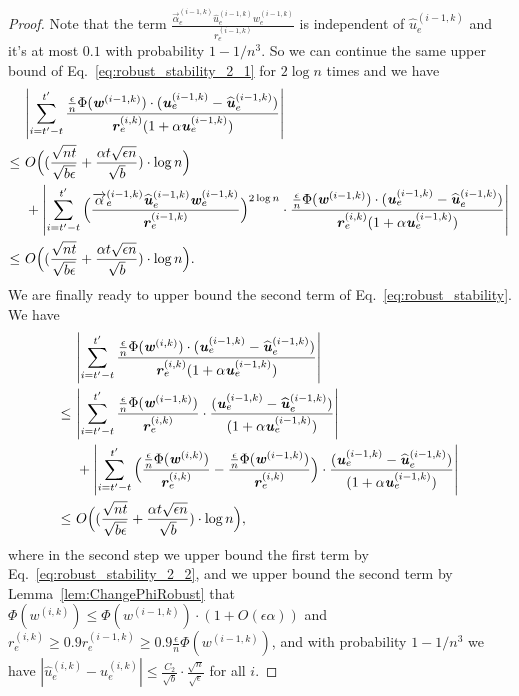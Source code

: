 \documentclass[11pt]{article}
\let\originalleft\left
\let\originalright\right
\renewcommand{\left}{\mathopen{}\mathclose\bgroup\originalleft}
\renewcommand{\right}{\aftergroup\egroup\originalright}
\newcommand\rr{\boldsymbol{\mathit{r}}}
\newcommand\uu{\boldsymbol{\mathit{u}}}
\newcommand\ww{\boldsymbol{\mathit{w}}}
\newcommand{\wh}{\widehat}
\begin{document}
\begin{proof}
Note that the term $\frac{\overrightarrow{\alpha}_e^{(i-1,k)} \wh{\uu}_e^{(i-1,k)} \ww_e^{(i-1,k)}}{\rr_e^{(i-1,k)}}$ is independent of $\wh{\uu}_e^{(i-1,k)}$ and it's at most $0.1$ with probability $1-1/n^3$. So we can continue the same upper bound of Eq.~\eqref{eq:robust_stability_2_1} for $2 \log n$ times and we have
\begin{align}\label{eq:robust_stability_2_2}
&~ \left|\sum_{i = t'-t}^{t'} \frac{\frac{\epsilon}{n} \Phi(\ww^{(i-1,k)}) \cdot ( \uu_e^{(i-1,k)} - \wh{\uu}_e^{(i-1,k)})}{\rr_e^{(i,k)} (1 + \alpha \uu_e^{(i-1,k)})}\right| \notag \\
\leq &~ O\Big((\frac{\sqrt{nt}}{\sqrt{b \epsilon}} + \frac{\alpha t \sqrt{\epsilon n}}{\sqrt{b}})\cdot \log n \Big) \notag \\ 
&~ + \left|\sum_{i = t'-t}^{t'}  \Big(\frac{\overrightarrow{\alpha}_e^{(i-1,k)} \wh{\uu}_e^{(i-1,k)} \ww_e^{(i-1,k)}}{\rr_e^{(i-1,k)}}\Big)^{2 \log n} \cdot \frac{\frac{\epsilon}{n} \Phi(\ww^{(i-1,k)}) \cdot (\uu_e^{(i-1,k)} - \wh{\uu}_e^{(i-1,k)})}{\rr_e^{(i,k)} (1 + \alpha \uu_e^{(i-1,k)})} \right| \notag \\
\leq &~ O\Big((\frac{\sqrt{nt}}{\sqrt{b \epsilon}} + \frac{\alpha t \sqrt{\epsilon n}}{\sqrt{b}})\cdot \log n \Big).
\end{align}
We are finally ready to upper bound the second term of Eq.~\eqref{eq:robust_stability}. We have
\begin{align}\label{eq:robust_stability_2}
&~ \left|\sum_{i = t'-t}^{t'} \frac{\frac{\epsilon}{n} \Phi(\ww^{(i,k)}) \cdot ( \uu_e^{(i-1,k)} - \wh{\uu}_e^{(i-1,k)})}{\rr_e^{(i,k)} (1 + \alpha \uu_e^{(i-1,k)})}\right| \notag \\
\leq &~ \left|\sum_{i = t'-t}^{t'} \frac{\frac{\epsilon}{n} \Phi(\ww^{(i-1,k)}) }{\rr_e^{(i,k)}} \cdot \frac{(\uu_e^{(i-1,k)} - \wh{\uu}_e^{(i-1,k)})}{(1 + \alpha \uu_e^{(i-1,k)})} \right|  \notag \\
&~ + \left|\sum_{i = t'-t}^{t'} \Big(\frac{\frac{\epsilon}{n} \Phi(\ww^{(i,k)})}{\rr_e^{(i,k)}} - \frac{\frac{\epsilon}{n} \Phi(\ww^{(i-1,k)})}{\rr_e^{(i,k)}}\Big) \cdot \frac{(\uu_e^{(i-1,k)} - \wh{\uu}_e^{(i-1,k)})}{(1 + \alpha \uu_e^{(i-1,k)})} \right| \notag \\
\leq &~ O\Big((\frac{\sqrt{nt}}{\sqrt{b \epsilon}} + \frac{\alpha t \sqrt{\epsilon n}}{\sqrt{b}})\cdot \log n \Big), 
\end{align}
where in the second step we upper bound the first term by Eq.~\eqref{eq:robust_stability_2_2}, and we upper bound the second term by Lemma~\ref{lem:ChangePhiRobust} that $\Phi(\ww^{(i,k)}) \leq \Phi(\ww^{(i-1,k)}) \cdot (1 + O(\epsilon \alpha))$ and $\rr_e^{(i,k)} \geq 0.9 \rr_e^{(i-1,k)} \geq 0.9 \frac{\epsilon}{n} \Phi(\ww^{(i-1,k)})$, and with probability $1-1/n^3$ we have $|\wh{\uu}^{(i,k)}_e - \uu^{(i,k)}_e| \leq \frac{C_2}{\sqrt{b}} \cdot \frac{\sqrt{n}}{\sqrt{\epsilon}}$ for all $i$.


\end{proof}
\end{document}

